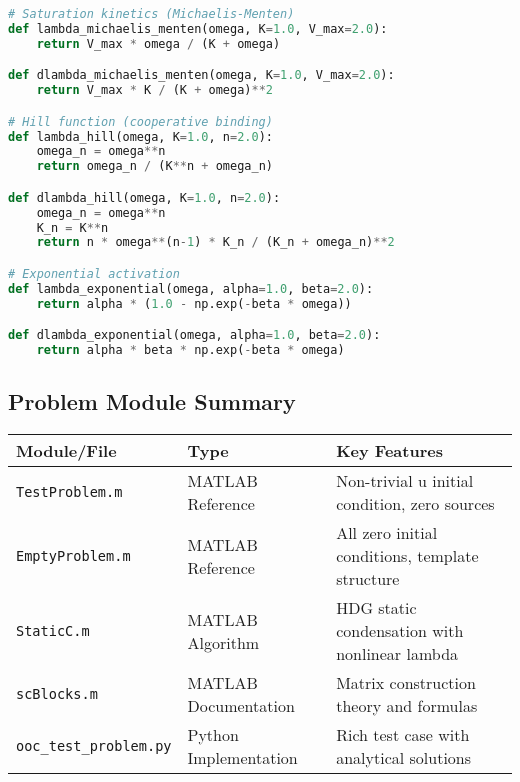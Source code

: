 \begin{lstlisting}[language=Python, caption=Expected Alternative Lambda Functions]
# Saturation kinetics (Michaelis-Menten)
def lambda_michaelis_menten(omega, K=1.0, V_max=2.0):
    return V_max * omega / (K + omega)

def dlambda_michaelis_menten(omega, K=1.0, V_max=2.0):
    return V_max * K / (K + omega)**2

# Hill function (cooperative binding)
def lambda_hill(omega, K=1.0, n=2.0):
    omega_n = omega**n
    return omega_n / (K**n + omega_n)

def dlambda_hill(omega, K=1.0, n=2.0):
    omega_n = omega**n
    K_n = K**n
    return n * omega**(n-1) * K_n / (K_n + omega_n)**2

# Exponential activation
def lambda_exponential(omega, alpha=1.0, beta=2.0):
    return alpha * (1.0 - np.exp(-beta * omega))

def dlambda_exponential(omega, alpha=1.0, beta=2.0):
    return alpha * beta * np.exp(-beta * omega)
\end{lstlisting}

\subsection{Problem Module Summary}
\label{subsec:problem_module_summary}

\begin{longtable}{|p{4cm}|p{3cm}|p{6cm}|}
\hline
\textbf{Module/File} & \textbf{Type} & \textbf{Key Features} \\
\hline
\endhead

\texttt{TestProblem.m} & MATLAB Reference & Non-trivial u initial condition, zero sources \\
\hline

\texttt{EmptyProblem.m} & MATLAB Reference & All zero initial conditions, template structure \\
\hline

\texttt{StaticC.m} & MATLAB Algorithm & HDG static condensation with nonlinear lambda \\
\hline

\texttt{scBlocks.m} & MATLAB Documentation & Matrix construction theory and formulas \\
\hline

\texttt{ooc\_test\_problem.py} & Python Implementation & Rich test case with analytical solutions \\
\hline

\end{longtable}

